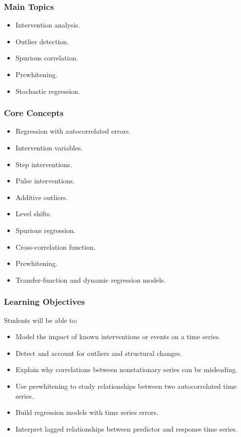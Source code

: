 \documentclass[11pt]{article}
\begin{document}
\subsubsection*{Main Topics}
\begin{itemize}
    \item Intervention analysis.
    \item Outlier detection.
    \item Spurious correlation.
    \item Prewhitening.
    \item Stochastic regression.
\end{itemize}

\subsubsection*{Core Concepts}
\begin{itemize}
    \item Regression with autocorrelated errors.
    \item Intervention variables.
    \item Step interventions.
    \item Pulse interventions.
    \item Additive outliers.
    \item Level shifts.
    \item Spurious regression.
    \item Cross-correlation function.
    \item Prewhitening.
    \item Transfer-function and dynamic regression models.
\end{itemize}

\subsubsection*{Learning Objectives}
Students will be able to:
\begin{itemize}
    \item Model the impact of known interventions or events on a time series.
    \item Detect and account for outliers and structural changes.
    \item Explain why correlations between nonstationary series can be misleading.
    \item Use prewhitening to study relationships between two autocorrelated time series.
    \item Build regression models with time series errors.
    \item Interpret lagged relationships between predictor and response time series.
\end{itemize}
\end{document}
